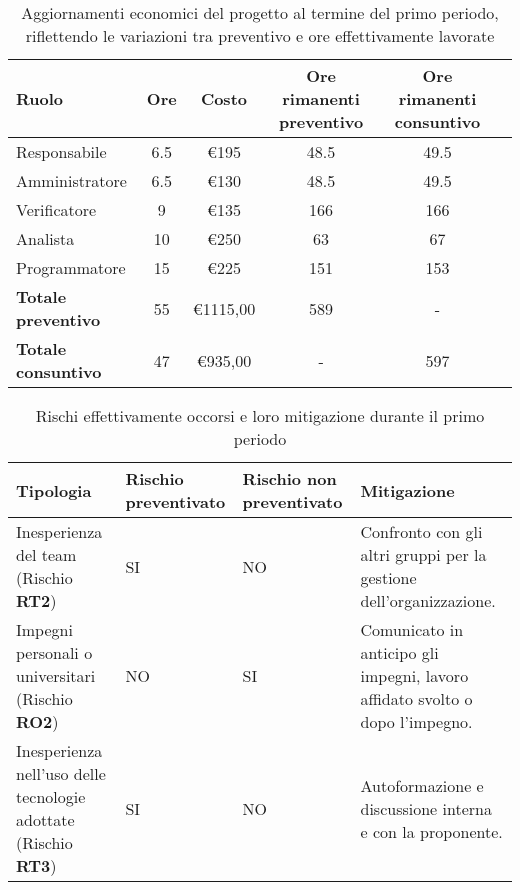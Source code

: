         \begin{table}[!h]
            \centering
            \begin{tabular}{|l| c| c| c| c| c| } 
                \hline
                \textbf{Ruolo} & \textbf{Ore} & \textbf{Costo} & \textbf{Ore rimanenti preventivo} & \textbf{Ore rimanenti consuntivo} \\
                \hline  
                 Responsabile        & 6.5 & €195 & 48.5 & 49.5 \\ 
                 Amministratore      & 6.5 & €130 & 48.5 & 49.5 \\ 
                 Verificatore        & 9   & €135 & 166  & 166 \\ 
                 Analista            & 10  & €250 & 63   & 67 \\ 
                 Programmatore       & 15  & €225 & 151  & 153 \\ 
                \hline
                \textbf{Totale preventivo} & 55 & €1115,00 & 589 & - \\
                \hline
                \textbf{Totale consuntivo} & 47 & €935,00 & - & 597 \\
                \hline
            \end{tabular}
            \caption{Aggiornamenti economici del progetto al termine del primo periodo, riflettendo le variazioni tra preventivo e ore effettivamente lavorate}
            \label{tab:3}
        \end{table}
        \begin{table}[!h]
            \centering
            \begin{tabular}{|p{4cm}| p{4cm}| p{4cm}| p{4cm}|} 
                \hline
                \textbf{Tipologia} & \textbf{Rischio preventivato} & \textbf{Rischio non preventivato} & \textbf{Mitigazione}  \\
                \hline  
                Inesperienza del team (Rischio \textbf{RT2}) & SI & NO & Confronto con gli altri gruppi per la gestione dell'organizzazione.\\
                \hline
                Impegni personali o universitari (Rischio \textbf{RO2})& NO & SI & Comunicato in anticipo gli impegni, lavoro affidato svolto o dopo l'impegno.\\
                \hline
                Inesperienza nell'uso delle tecnologie adottate (Rischio \textbf{RT3}) & SI & NO & Autoformazione e discussione interna e con la proponente.\\
                \hline
            \end{tabular}
            \caption{Rischi effettivamente occorsi e loro mitigazione durante il primo periodo}
            \label{tab:4}
        \end{table}
